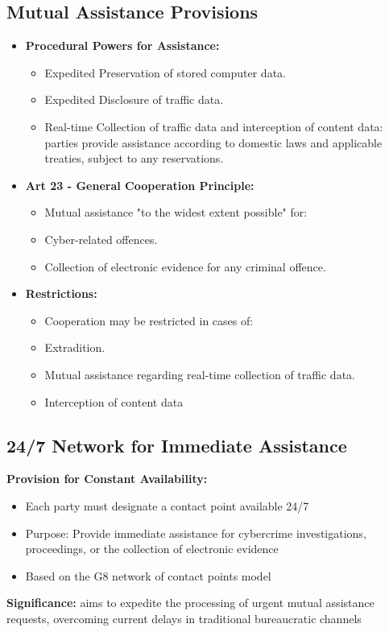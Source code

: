 \subsection{Mutual Assistance Provisions}
\begin{itemize}[itemsep=0pt]
  \item  \textbf{Procedural Powers for Assistance:}
    \begin{itemize}[itemsep=0pt]
      \item Expedited Preservation of stored computer data.
      \item Expedited Disclosure of traffic data.
      \item Real-time Collection of traffic data and interception of content data: parties provide assistance according to domestic laws and applicable treaties, subject to any reservations.
    \end{itemize}
  \item \textbf{Art 23 - General Cooperation Principle:}
    \begin{itemize}[itemsep=0pt]
      \item Mutual assistance "to the widest extent possible" for:
      \item Cyber-related offences.
      \item Collection of electronic evidence for any criminal offence.
    \end{itemize}
  \item \textbf{Restrictions:}
    \begin{itemize}[itemsep=0pt]
      \item Cooperation may be restricted in cases of:
      \item Extradition.
      \item Mutual assistance regarding real-time collection of traffic data.
      \item Interception of content data
    \end{itemize}
\end{itemize}

\subsection{24/7 Network for Immediate Assistance}
\textbf{Provision for Constant Availability:}
\begin{itemize}[itemsep=0pt]
  \item Each party must designate a contact point available 24/7
  \item Purpose: Provide immediate assistance for cybercrime investigations, proceedings, or the collection of electronic evidence
  \item Based on the G8 network of contact points model
\end{itemize}
\textbf{Significance:} aims to expedite the processing of urgent
mutual assistance requests, overcoming current delays in
traditional bureaucratic channels


